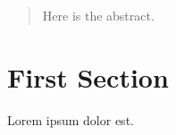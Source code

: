 \documentclass[11pt,letterpaper,fleqn,oneside,margin=2in]{article}
\begin{document}
\maketitle%

\begin{abstract}
Here is the abstract.
\end{abstract}

\newpage
\tableofcontents


\newpage
\onehalfspacing
\section{First Section}
Lorem ipsum dolor est.

% 



\newpage
\singlespacing
\nocite{*}

\normalsize





\end{document}
